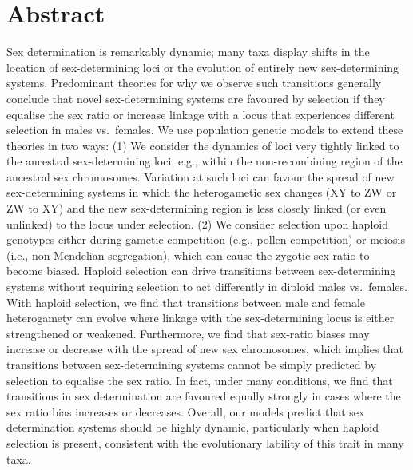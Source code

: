 \documentclass[10pt,letterpaper]{article}
\begin{document}
\section*{Abstract}
Sex determination is remarkably dynamic; many taxa display shifts in the location of sex-determining loci or the evolution of entirely new sex-determining systems. 
Predominant theories for why we observe such transitions generally conclude that novel sex-determining systems are favoured by selection if they equalise the sex ratio or increase linkage with a locus that experiences different selection in males vs.\ females. 
We use population genetic models to extend these theories in two ways: 
(1) We consider the dynamics of loci very tightly linked to the ancestral sex-determining loci, e.g., within the non-recombining region of the ancestral sex chromosomes. 
Variation at such loci can favour the spread of new sex-determining systems in which the heterogametic sex changes (XY to ZW or ZW to XY) and the new sex-determining region is less closely linked (or even unlinked) to the locus under selection. 
(2) We consider selection upon haploid genotypes either during gametic competition (e.g., pollen competition) or meiosis (i.e., non-Mendelian segregation), which can cause the zygotic sex ratio to become biased. 
Haploid selection can drive transitions between sex-determining systems without requiring selection to act differently in diploid males vs.\ females. 
With haploid selection, we find that transitions between male and female heterogamety can evolve where linkage with the sex-determining locus is either strengthened or weakened. 
Furthermore, we find that sex-ratio biases may increase or decrease with the spread of new sex chromosomes, which implies that transitions between sex-determining systems cannot be simply predicted by selection to equalise the sex ratio.
In fact, under many conditions, we find that transitions in sex determination are favoured equally strongly in cases where the sex ratio bias increases or decreases.
Overall, our models predict that sex determination systems should be highly dynamic, particularly when haploid selection is present, consistent with the evolutionary lability of this trait in many taxa.
\end{document}
